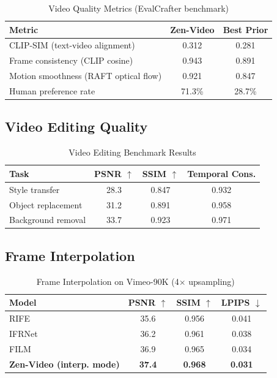 \documentclass[11pt,a4paper]{article}
\begin{document}
\begin{table}[H]
\centering
\begin{tabular}{lcc}
\toprule
\textbf{Metric} & \textbf{Zen-Video} & \textbf{Best Prior} \\
\midrule
CLIP-SIM (text-video alignment) & 0.312 & 0.281 \\
Frame consistency (CLIP cosine) & 0.943 & 0.891 \\
Motion smoothness (RAFT optical flow) & 0.921 & 0.847 \\
Human preference rate & 71.3\% & 28.7\% \\
\bottomrule
\end{tabular}
\caption{Video Quality Metrics (EvalCrafter benchmark)}
\end{table}

\subsection{Video Editing Quality}

\begin{table}[H]
\centering
\begin{tabular}{lccc}
\toprule
\textbf{Task} & \textbf{PSNR} $\uparrow$ & \textbf{SSIM} $\uparrow$ & \textbf{Temporal Cons.} \\
\midrule
Style transfer & 28.3 & 0.847 & 0.932 \\
Object replacement & 31.2 & 0.891 & 0.958 \\
Background removal & 33.7 & 0.923 & 0.971 \\
\bottomrule
\end{tabular}
\caption{Video Editing Benchmark Results}
\end{table}

\subsection{Frame Interpolation}

\begin{table}[H]
\centering
\begin{tabular}{lccc}
\toprule
\textbf{Model} & \textbf{PSNR} $\uparrow$ & \textbf{SSIM} $\uparrow$ & \textbf{LPIPS} $\downarrow$ \\
\midrule
RIFE & 35.6 & 0.956 & 0.041 \\
IFRNet & 36.2 & 0.961 & 0.038 \\
FILM & 36.9 & 0.965 & 0.034 \\
\textbf{Zen-Video (interp. mode)} & \textbf{37.4} & \textbf{0.968} & \textbf{0.031} \\
\bottomrule
\end{tabular}
\caption{Frame Interpolation on Vimeo-90K (4$\times$ upsampling)}
\end{table}
\end{document}
